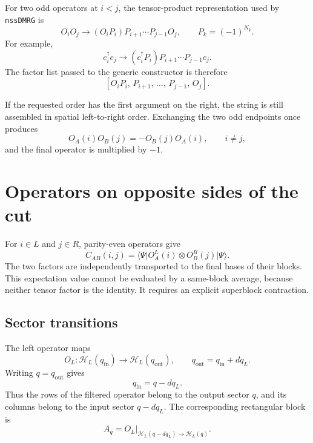 \documentclass[11pt,a4paper]{article}
\newcommand{\ket}[1]{\lvert #1\rangle}
\newcommand{\bra}[1]{\langle #1\rvert}
\newcommand{\Hil}{\mathcal H}
\begin{document}
For two odd operators at $i<j$, the tensor-product representation used by
\texttt{nssDMRG} is
\begin{equation}
  O_iO_j
  \longrightarrow
  (O_iP_i)P_{i+1}\cdots P_{j-1}O_j,
  \qquad P_k=(-1)^{N_k}.
\end{equation}
For example,
\begin{equation}
  c_i^\dagger c_j
  \longrightarrow
  (c_i^\dagger P_i)P_{i+1}\cdots P_{j-1}c_j.
\end{equation}
The factor list passed to the generic constructor is therefore
\begin{equation}
  \left[O_iP_i,\,P_{i+1},\,\ldots,\,P_{j-1},\,O_j\right].
\end{equation}

If the requested order has the first argument on the right, the string is
still assembled in spatial left-to-right order.  Exchanging the two odd
endpoints once produces
\begin{equation}
  O_A(i)O_B(j)=-O_B(j)O_A(i),
  \qquad i\ne j,
\end{equation}
and the final operator is multiplied by $-1$.

\section{Operators on opposite sides of the cut}

For $i\in L$ and $j\in R$, parity-even operators give
\begin{equation}
  C_{AB}(i,j)
  =\bra{\Psi}O_A^L(i)\otimes O_B^R(j)\ket{\Psi}.
\end{equation}
The two factors are independently transported to the final bases of their
blocks.  This expectation value cannot be evaluated by a same-block average,
because neither tensor factor is the identity.  It requires an explicit
superblock contraction.

\subsection{Sector transitions}

The left operator maps
\begin{equation}
  O_L:\Hil_L(q_{\mathrm{in}})\longrightarrow\Hil_L(q_{\mathrm{out}}),
  \qquad
  q_{\mathrm{out}}=q_{\mathrm{in}}+dq_L.
\end{equation}
Writing $q=q_{\mathrm{out}}$ gives
\begin{equation}
  q_{\mathrm{in}}=q-dq_L.
\end{equation}
Thus the rows of the filtered operator belong to the output sector $q$, and
its columns belong to the input sector $q-dq_L$.  The corresponding
rectangular block is
\begin{equation}
  A_q=
  O_L\big|_{\Hil_L(q-dq_L)\rightarrow\Hil_L(q)}.
\end{equation}
\end{document}
